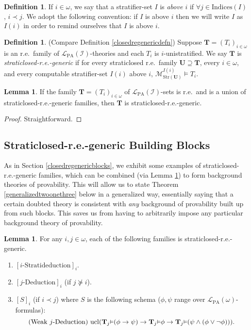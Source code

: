 \documentclass[reqno]{article}
\theoremstyle{definition}
\newtheorem{lemma}[theorem]{Lemma}
\newtheorem{definition}[theorem]{Definition}
\def\L{\mathscr{L}}
\def\M{\mathscr{M}}
\def\T{\mathbf{T}}
\def\U{\mathbf{U}}
\def\indices{\mathrm{Indices}}
\def\LPA{\L_{\mathrm{PA}}}
\def\indset{\mathcal I}
\renewcommand{\Pr}[1]{\T_{#1}\mbox{\small${\vDash}$}}
\newcommand{\ucl}[1]{\mathrm{ucl}(#1)}
\newcommand{\str}[1]{\mathrm{Str}(#1)} \newcommand{\Str}[1]{\str{#1}}
\begin{document}

\begin{definition}
If $i\in\omega$, we say that a stratifier-set $I$ is \emph{above $i$}
if $\forall j\in\indices(I)$, $i\prec j$. We adopt the following convention:
if $I$ is above $i$ then we will write $I$ as $I(i)$ in order to remind
ourselves that $I$ is above $i$.
\end{definition}

\begin{definition}
\label{bootstrapclosedrestrat}
(Compare Definition \ref{closedregenericdefn})
Suppose $\T=(T_i)_{i\in\omega}$
is an r.e.~family of $\LPA(\indset)$-theories
and each $T_i$ is $i$-unistratified.
We say $\T$ is \emph{straticlosed-r.e.-generic} if
for every straticlosed r.e.~family $\U\supseteq\T$, every $i\in\omega$,
and every computable stratifier-set $I(i)$ above $i$,
$\M^{I(i)}_{\str\U}\models T_i$.
\end{definition}


\begin{lemma}
\label{straticlosedstitching}
If the family $\T=(T_i)_{i\in\omega}$ of $\LPA(\indset)$-sets is r.e.~and is a union
of straticlosed-r.e.-generic families, then $\T$ is straticlosed-r.e.-generic.
\end{lemma}

\begin{proof}
Straightforward.
\end{proof}

\subsection{Straticlosed-r.e.-generic Building Blocks}

As in Section \ref{closedregenericblocks}, we exhibit some examples of
straticlosed-r.e.-generic families, which can be combined (via
Lemma \ref{straticlosedstitching}) to form background theories of
provability. This will allow us to state Theorem \ref{generalizedtwoonethree}
below in a generalized way, essentially saying that a certain doubted
theory is consistent with \emph{any} background of provability built up
from such blocks. This saves us from having to arbitrarily impose any
particular background theory of provability.



\begin{lemma}
\label{secondutilbagdeduction}
For any $i,j\in\omega$, each of the following families is straticlosed-r.e.-generic.
\begin{enumerate}
\item $[\mbox{$i$-Stratideduction}]_i$.
\item $[\mbox{$j$-Deduction}]_i$ (if $j\not\succeq i$).
\item $[S]_i$ (if $i\prec j$) where $S$ is the following schema ($\phi,\psi$
    range over $\LPA(\omega)$-formulas):
\[
  \mbox{
    (Weak $j$-Deduction) $\ucl{\Pr j(\phi\rightarrow\psi)\rightarrow\Pr j\phi\rightarrow \Pr 
    j(\psi\wedge(\phi\vee\neg\phi))}$.
  }
\]
\end{enumerate}
\end{lemma}
\end{document}
